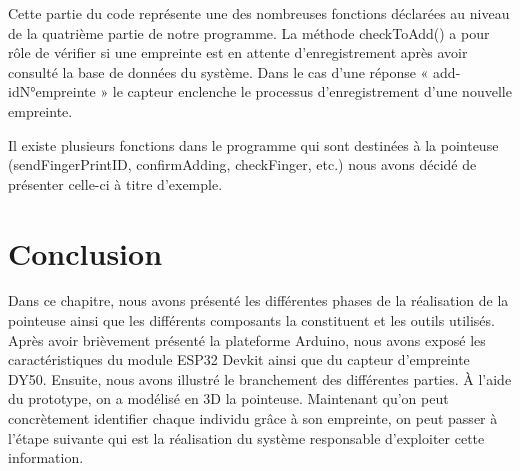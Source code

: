 Cette partie du code représente une des nombreuses fonctions déclarées au niveau
de la quatrième partie de notre programme. La méthode checkToAdd() a pour rôle
de vérifier si une empreinte est en attente d’enregistrement après avoir
consulté la base de données du système. Dans le cas d’une réponse «
add-idN°empreinte » le capteur enclenche le processus d’enregistrement d’une
nouvelle empreinte.

Il existe plusieurs fonctions dans le programme qui sont destinées à la
pointeuse (sendFingerPrintID, confirmAdding, checkFinger, etc.) nous avons
décidé de présenter celle-ci à titre d’exemple.

\section{Conclusion}
Dans ce chapitre, nous avons présenté les différentes phases de la réalisation
de la pointeuse ainsi que les différents composants la constituent et les outils
utilisés. Après avoir brièvement présenté la plateforme Arduino, nous avons
exposé les caractéristiques du module ESP32 Devkit ainsi que du capteur
d’empreinte DY50. Ensuite, nous avons illustré le branchement des différentes
parties. À l’aide du prototype, on a modélisé en 3D la pointeuse.  Maintenant
qu’on peut concrètement identifier chaque individu grâce à son empreinte, on
peut passer à l’étape suivante qui est la réalisation du système responsable
d’exploiter cette information.  
